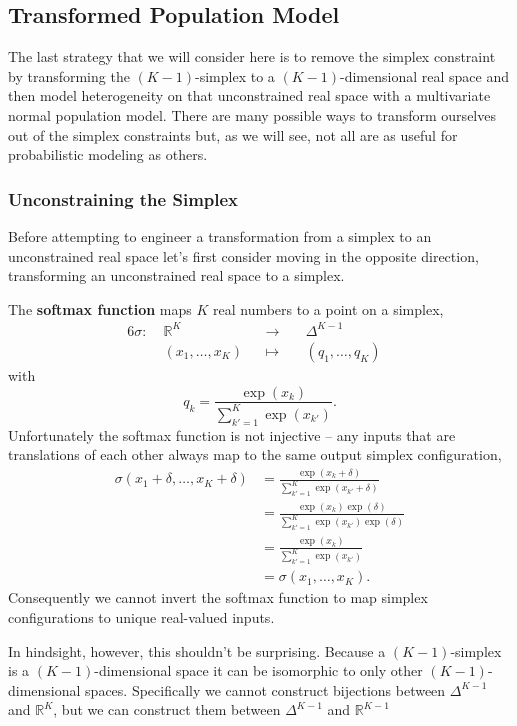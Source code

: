 \documentclass[
  letterpaper,
  DIV=11,
  numbers=noendperiod]{scrartcl}
\begin{document}
\subsection{Transformed Population Model}\label{sec:transformedpop}

The last strategy that we will consider here is to remove the simplex
constraint by transforming the \((K - 1)\)-simplex to a
\((K - 1)\)-dimensional real space and then model heterogeneity on that
unconstrained real space with a multivariate normal population model.
There are many possible ways to transform ourselves out of the simplex
constraints but, as we will see, not all are as useful for probabilistic
modeling as others.

\subsubsection{Unconstraining the
Simplex}\label{unconstraining-the-simplex}

Before attempting to engineer a transformation from a simplex to an
unconstrained real space let's first consider moving in the opposite
direction, transforming an unconstrained real space to a simplex.

The \textbf{softmax function} maps \(K\) real numbers to a point on a
simplex, \begin{alignat*}{6}
\sigma :\; & \mathbb{R}^{K} & &\rightarrow& \; & \Delta^{K - 1} &
\\
& (x_{1}, \ldots, x_{K}) & &\mapsto& & (q_{1}, \ldots, q_{K}) &
\end{alignat*} with \[
q_{k} = \frac{ \exp( x_{k} ) }{ \sum_{k' = 1}^{K} \exp( x_{k'} ) }.
\] Unfortunately the softmax function is not injective -- any inputs
that are translations of each other always map to the same output
simplex configuration, \begin{align*}
\sigma( x_{1} + \delta, \ldots, x_{K} + \delta)
&=
\frac{ \exp( x_{k} + \delta ) }{ \sum_{k' = 1}^{K} \exp( x_{k'} + \delta ) }
\\
&=
\frac{ \exp( x_{k} ) \exp( \delta ) }{ \sum_{k' = 1}^{K} \exp( x_{k'} ) \exp( \delta ) }
\\
&=
\frac{ \exp( x_{k} ) }{ \sum_{k' = 1}^{K} \exp( x_{k'} ) }
\\
&=
\sigma( x_{1}, \ldots, x_{K} ).
\end{align*} Consequently we cannot invert the softmax function to map
simplex configurations to unique real-valued inputs.

In hindsight, however, this shouldn't be surprising. Because a
\((K - 1)\)-simplex is a \((K - 1)\)-dimensional space it can be
isomorphic to only other \((K - 1)\)-dimensional spaces. Specifically we
cannot construct bijections between \(\Delta^{K - 1}\) and
\(\mathbb{R}^{K}\), but we can construct them between \(\Delta^{K - 1}\)
and \(\mathbb{R}^{K - 1}\)
\end{document}
